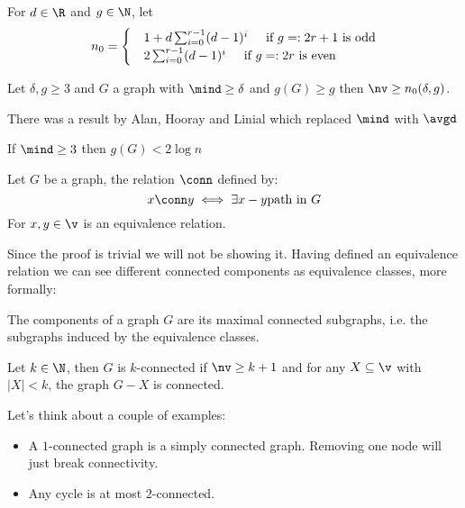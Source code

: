 \begin{customproposition}{1.8}
    \label{proposition:1.8}
    For $d \in \R$ and $g \in \N$, let
    \begin{equation*}
        n_0 =
        \begin{cases}
            &1 + d \sum_{i = 0}^{r - 1}(d - 1)^i \hspace{5mm} \text{if $g =: 2r + 1$ is odd}\\
            &2\sum_{i = 0}^{r - 1}(d - 1)^i \hspace{5mm} \text{if $g =: 2r$ is even}
        \end{cases}
    \end{equation*}
\end{customproposition}
Let $\delta, g \geq 3$ and $G$ a graph with $\mind \geq \delta$ and $g(G) \geq g$ then $\nv \geq n_0(\delta, g)$.\\
\begin{coolfact}
    There was a result by Alan, Hooray and Linial which replaced $\mind$ with $\avgd$
\end{coolfact}
\begin{customcorollary}{1.9}
    \label{corollary:1.9}
    If $\mind \geq 3$ then $g(G) < 2\log{n}$
\end{customcorollary}
\begin{customlemma}{1.11}
    \label{lemma:1.11}
    Let $G$ be a graph, the relation $\conn$ defined by:
    \begin{equation*}
        x \conn y \iff \exists x-y \text{path in } G
    \end{equation*}
    For $x, y \in \v$ is an equivalence relation.
\end{customlemma}
Since the proof is trivial we will not be showing it. Having defined an equivalence relation we can see different connected components as equivalence classes, more formally:
\begin{definition}[Component]
    The components of a graph $G$ are its maximal connected subgraphs, i.e. the subgraphs induced by the equivalence classes.
\end{definition}
\begin{definition}[$k$-connectivity]
    Let $k \in \N$, then $G$ is $k$-connected if $\nv \geq k + 1$ and for any $X \subseteq \v$ with $|X| < k$, the graph $G - X$ is connected.
\end{definition}
Let's think about a couple of examples:
\begin{itemize}
    \item A $1$-connected graph is a simply connected graph. Removing one node will just break connectivity.
    \item Any cycle is at most $2$-connected.
\end{itemize}
